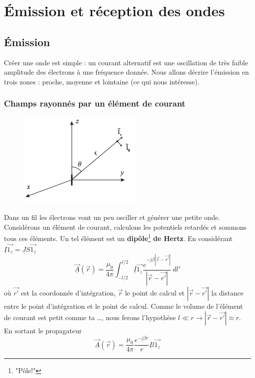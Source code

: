 \chapter{Émission et réception des ondes}
\section{Émission}
Créer une onde est simple : un courant alternatif est une oscillation de très faible 
amplitude des électrons à une fréquence donnée. Nous allons décrire l'émission en 
trois zones : proche, moyenne et lointaine (ce qui nous intéresse).

	\subsection{Champs rayonnés par un élément de courant}
	\begin{figure}
	\vspace{-20mm}
	\includegraphics[scale=0.45]{ch4/image1.png}
	\end{figure}
	Dans un fil les électrons vont un peu osciller et générer une petite onde. 
	Considérons un élément de courant, calculons les potentiels retardés et 
	sommons tous ces éléments. Un tel élément est un \textbf{dipôle}\footnote{"Pôle!"} 
	\textbf{de Hertz}. En considérant $\underline{I}\vec{1_z} = \underline{J}S\vec{1_z}$ 
	\begin{equation}
	\underline{\vec{A}}(\vec{r}) = \dfrac{\mu_0}{4\pi}\int_{-l/2}^{l/2} 
	\underline{I}\vec{1_z} \dfrac{e^{-j\beta|\vec{r}-\vec{r'}|}}{|\vec{r}-\vec{r'}|}\ dl'
	\end{equation}
	où $\vec{r'}$ est la coordonnée d'intégration, $\vec{r}$ le point de calcul et 
	$|\vec{r}-\vec{r'}|$ la distance entre le point d'intégration et le point de calcul.
	Comme le volume de l'élément de courant est petit comme ta \dots, nous ferons 
	l'hypothèse $l\ll r \rightarrow |\vec{r}-\vec{r'}| \approx r$. En sortant le propagateur
	\begin{equation}
	\underline{\vec{A}}(\vec{r}) = \dfrac{\mu_0}{4\pi}\dfrac{e^{-j\beta r}}{r}\underline{I}l
	\vec{1_z}
	\end{equation}
